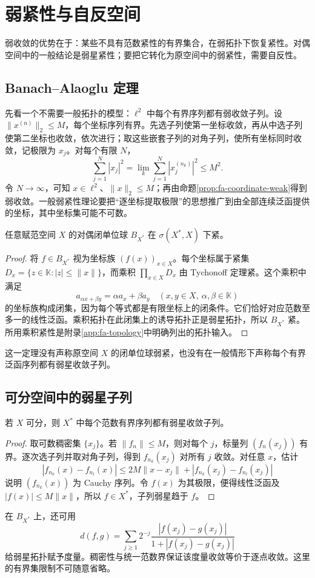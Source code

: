 \setcounter{chapter}{8} %
\chapter{弱紧性与自反空间}
\label{chap:fa-reflexive}

弱收敛的优势在于：某些不具有范数紧性的有界集合，在弱拓扑下恢复紧性。对偶空间中的一般结论是弱星紧性；要把它转化为原空间中的弱紧性，需要自反性。

\section{Banach--Alaoglu 定理}
先看一个不需要一般拓扑的模型：$\ell^2$ 中每个有界序列都有弱收敛子列。设 $\|x^{(n)}\|_2\leq M$，每个坐标序列有界。先选子列使第一坐标收敛，再从中选子列使第二坐标也收敛，依次进行；取这些嵌套子列的对角子列，使所有坐标同时收敛，记极限为 $x_j$。对每个有限 $N$，
\[
 \sum_{j=1}^N|x_j|^2=\lim_k\sum_{j=1}^N|x_j^{(n_k)}|^2\leq M^2.
\]
令 $N\to\infty$，可知 $x\in\ell^2$、$\|x\|_2\leq M$；再由命题\ref{prop:fa-coordinate-weak}得到弱收敛。一般弱紧性理论要把“逐坐标提取极限”的思想推广到由全部连续泛函提供的坐标，其中坐标集可能不可数。

\begin{theorem}\label{thm:fa-alaoglu}
任意赋范空间 $X$ 的对偶闭单位球 $B_{X^*}$ 在 $\sigma(X^*,X)$ 下紧。
\end{theorem}
\begin{proof}
将 $f\in B_{X^*}$ 视为坐标族 $(f(x))_{x\in X}$。每个坐标属于紧集 $D_x=\{z\in\mathbb K:|z|\leq\|x\|\}$，而乘积 $\prod_{x\in X}D_x$ 由 Tychonoff 定理紧。这个乘积中满足
\[
 a_{\alpha x+\beta y}=\alpha a_x+\beta a_y
 \quad(x,y\in X,\ \alpha,\beta\in\mathbb K)
\]
的坐标族构成闭集，因为每个等式都是有限坐标上的闭条件。它们恰好对应范数至多一的线性泛函。乘积拓扑在此闭集上的诱导拓扑正是弱星拓扑，所以 $B_{X^*}$ 紧。所用乘积紧性是附录\ref{app:fa-topology}中明确列出的拓扑输入。
\end{proof}
这一定理没有声称原空间 $X$ 的闭单位球弱紧，也没有在一般情形下声称每个有界泛函序列都有弱星收敛子列。

\section{可分空间中的弱星子列}
\begin{theorem}\label{thm:fa-weak-star-subsequence}
若 $X$ 可分，则 $X^*$ 中每个范数有界序列都有弱星收敛子列。
\end{theorem}
\begin{proof}
取可数稠密集 $\{x_j\}$。若 $\|f_n\|\leq M$，则对每个 $j$，标量列 $(f_n(x_j))$ 有界。逐次选子列并取对角子列，得到 $f_{n_k}(x_j)$ 对所有 $j$ 收敛。对任意 $x$，估计
\[
 |f_{n_k}(x)-f_{n_l}(x)|\leq2M\|x-x_j\|
       +|f_{n_k}(x_j)-f_{n_l}(x_j)|
\]
说明 $(f_{n_k}(x))$ 为 Cauchy 序列。令 $f(x)$ 为其极限，便得线性泛函及 $|f(x)|\leq M\|x\|$，所以 $f\in X^*$，子列弱星趋于 $f$。
\end{proof}
在 $B_{X^*}$ 上，还可用
\[
 d(f,g)=\sum_{j\geq1}2^{-j}\frac{|f(x_j)-g(x_j)|}{1+|f(x_j)-g(x_j)|}
\]
给弱星拓扑赋予度量。稠密性与统一范数界保证该度量收敛等价于逐点收敛。这里的有界集限制不可随意省略。

